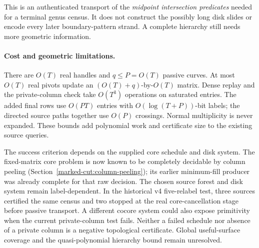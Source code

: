 This is an authenticated transport of the \emph{midpoint intersection
predicates} needed for a terminal genus census. It does not construct the
possibly long disk slides or encode every later boundary-pattern strand.
A complete hierarchy still needs more geometric information.

\paragraph{Cost and geometric limitations.}
There are $O(T)$ real handles and $q\le P=O(T)$ passive curves. At most
$O(T)$ real pivots update an $(O(T)+q)$-by-$O(T)$ matrix. Dense replay and
the private-column check take $O(T^3)$ operations on saturated entries.
The added final rows use $O(PT)$ entries with $O(\log(T+P))$-bit labels;
the directed source paths together use $O(P)$ crossings. Normal multiplicity
is never expanded. These bounds add polynomial work and certificate size to
the existing source queries.

The success criterion depends on the supplied core schedule and disk system.
The fixed-matrix core problem is now known to be completely decidable by
column peeling (Section~\ref{marked-cut:column-peeling}); its earlier
minimum-fill producer was already complete for that raw decision. The chosen
source forest and disk system remain label-dependent. In the historical v4
five-relabel test, three sources certified the same census and two stopped
at the real core-cancellation stage before passive transport. A different
cocore system could also expose primitivity when the current private-column
test fails. Neither a failed schedule nor absence of a private column is a
negative topological certificate. Global useful-surface coverage and the
quasi-polynomial hierarchy bound remain unresolved.


